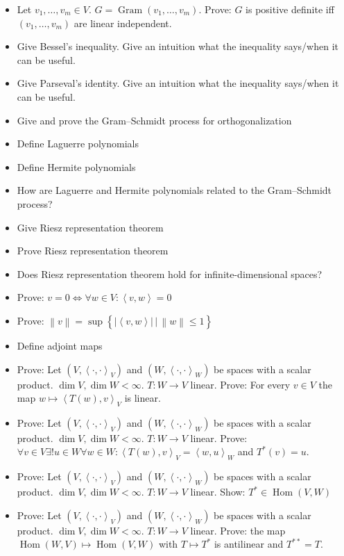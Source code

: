 \documentclass[a4paper]{article}
\newcommand{\setdef}[2]{\left\{\left.#1\,\right|\,#2\right\}}
\newcommand{\ip}[2]{\left\langle#1,#2\right\rangle} %
\newcommand{\norm}[1]{\left\|#1\right\|}
\newcommand{\card}[1]{\left|#1\right|}
\begin{document}
\begin{itemize}
  \item Let $v_1, \ldots, v_m \in V$. $G = \operatorname{Gram}(v_1, \ldots, v_m)$. Prove: $G$ is positive definite iff $(v_1, \ldots, v_m)$ are linear independent.
  \item Give Bessel's inequality. Give an intuition what the inequality says/when it can be useful.
  \item Give Parseval's identity. Give an intuition what the inequality says/when it can be useful.
  \item Give and prove the Gram--Schmidt process for orthogonalization
  \item Define Laguerre polynomials
  \item Define Hermite polynomials
  \item How are Laguerre and Hermite polynomials related to the Gram--Schmidt process?
  \item Give Riesz representation theorem
  \item Prove Riesz representation theorem
  \item Does Riesz representation theorem hold for infinite-dimensional spaces?
  \item Prove: $v = 0 \iff \forall w \in V: \ip vw = 0$
  \item Prove: $\norm{v} = \sup\setdef{\card{\ip vw}}{\norm{w} \leq 1}$
  \item Define adjoint maps
  \item Prove: Let $(V, \ip{\cdot}{\cdot}_V)$ and $(W, \ip{\cdot}{\cdot}_W)$ be spaces with a scalar product. $\dim{V}, \dim{W} < \infty$.
    $T: W \to V$ linear. Prove: For every $v \in V$ the map $w \mapsto \ip{T(w)}{v}_V$ is linear.
  \item Prove: Let $(V, \ip{\cdot}{\cdot}_V)$ and $(W, \ip{\cdot}{\cdot}_W)$ be spaces with a scalar product. $\dim{V}, \dim{W} < \infty$.
    $T: W \to V$ linear. Prove: $\forall v \in V \exists! u \in W \forall w \in W: \ip{T(w)}{v}_V = \ip{w}{u}_W$ and $T^*(v) = u$.
  \item Prove: Let $(V, \ip{\cdot}{\cdot}_V)$ and $(W, \ip{\cdot}{\cdot}_W)$ be spaces with a scalar product. $\dim{V}, \dim{W} < \infty$.
    $T: W \to V$ linear. Show: $T^* \in \operatorname{Hom}(V, W)$
  \item Prove: Let $(V, \ip{\cdot}{\cdot}_V)$ and $(W, \ip{\cdot}{\cdot}_W)$ be spaces with a scalar product. $\dim{V}, \dim{W} < \infty$.
    $T: W \to V$ linear. Prove: the map $\operatorname{Hom}(W, V) \mapsto \operatorname{Hom}(V, W)$ with $T \mapsto T^*$ is antilinear and $T^{**} = T$.

\end{itemize}
\end{document}
